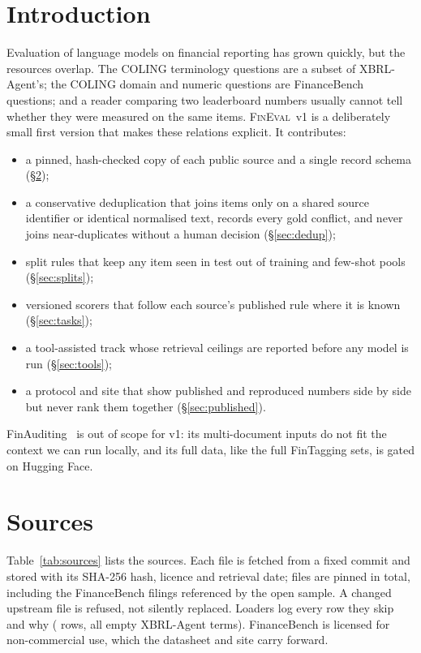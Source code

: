 \documentclass[10pt,twocolumn,a4paper]{article}
\newcommand{\fe}{\textsc{FinEval}~v1}
\begin{document}
\section{Introduction}
Evaluation of language models on financial reporting has grown quickly, but the resources overlap.
The COLING terminology questions are a subset of XBRL-Agent's; the COLING domain and numeric
questions are FinanceBench questions; and a reader comparing two leaderboard numbers usually cannot
tell whether they were measured on the same items. \fe{} is a deliberately small first version that
makes these relations explicit. It contributes:
\begin{itemize}
\item a pinned, hash-checked copy of each public source and a single record schema (\S\ref{sec:data});
\item a conservative deduplication that joins items only on a shared source identifier or identical
  normalised text, records every gold conflict, and never joins near-duplicates without a human
  decision (\S\ref{sec:dedup});
\item split rules that keep any item seen in test out of training and few-shot pools (\S\ref{sec:splits});
\item versioned scorers that follow each source's published rule where it is known (\S\ref{sec:tasks});
\item a tool-assisted track whose retrieval ceilings are reported before any model is run
  (\S\ref{sec:tools});
\item a protocol and site that show published and reproduced numbers side by side but never rank
  them together (\S\ref{sec:published}).
\end{itemize}
FinAuditing~\cite{wang2025finauditing} is out of scope for v1: its multi-document inputs do not fit
the context we can run locally, and its full data, like the full FinTagging sets, is gated on Hugging
Face.

\section{Sources}\label{sec:data}
Table~\ref{tab:sources} lists the sources. Each file is fetched from a fixed commit and stored with
its SHA-256 hash, licence and retrieval date; \nPinned{} files are pinned in total, including the
FinanceBench filings referenced by the open sample. A changed upstream file is refused, not silently
replaced. Loaders log every row they skip and why (\nSkipped{} rows, all empty XBRL-Agent terms).
FinanceBench is licensed for non-commercial use, which the datasheet and site carry forward.
\end{document}
